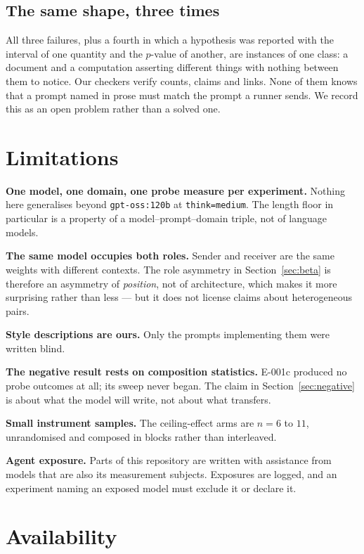 \documentclass[11pt]{article}
\begin{document}
\subsection{The same shape, three times}

All three failures, plus a fourth in which a hypothesis was reported with the
interval of one quantity and the $p$-value of another, are instances of one
class: a document and a computation asserting different things with nothing
between them to notice. Our checkers verify counts, claims and links. None of
them knows that a prompt named in prose must match the prompt a runner sends.
We record this as an open problem rather than a solved one.

\section{Limitations}

\textbf{One model, one domain, one probe measure per experiment.} Nothing here
generalises beyond \texttt{gpt-oss:120b} at \texttt{think=medium}. The length
floor in particular is a property of a model--prompt--domain triple, not of
language models.

\textbf{The same model occupies both roles.} Sender and receiver are the same
weights with different contexts. The role asymmetry in Section~\ref{sec:beta} is
therefore an asymmetry of \emph{position}, not of architecture, which makes it
more surprising rather than less --- but it does not license claims about
heterogeneous pairs.

\textbf{Style descriptions are ours.} Only the prompts implementing them were
written blind.

\textbf{The negative result rests on composition statistics.} E-001c produced no
probe outcomes at all; its sweep never began. The claim in
Section~\ref{sec:negative} is about what the model will write, not about what
transfers.

\textbf{Small instrument samples.} The ceiling-effect arms are $n = 6$ to $11$,
unrandomised and composed in blocks rather than interleaved.

\textbf{Agent exposure.} Parts of this repository are written with assistance
from models that are also its measurement subjects. Exposures are logged, and an
experiment naming an exposed model must exclude it or declare it.

\section{Availability}
\end{document}
